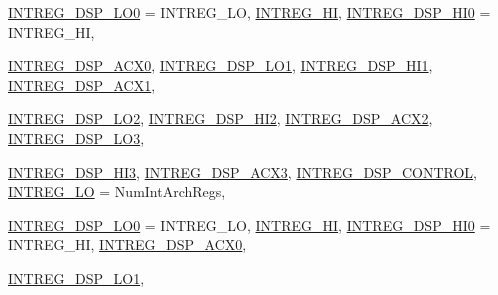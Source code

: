 \begin{DoxyCompactItemize}
\hyperlink{namespaceMipsISA_a9969c99e14b7b491ae9e3751404cc6a1a9a6440c5ae153540100888246bae0b41}{INTREG\_\-DSP\_\-LO0} =  INTREG\_\-LO, 
\hyperlink{namespaceMipsISA_a9969c99e14b7b491ae9e3751404cc6a1ab81dfa3bdd01e788f09f7a15a6efa175}{INTREG\_\-HI}, 
\hyperlink{namespaceMipsISA_a9969c99e14b7b491ae9e3751404cc6a1ac1c3dde172a813c59f953650384a4375}{INTREG\_\-DSP\_\-HI0} =  INTREG\_\-HI, 
\par
\hyperlink{namespaceMipsISA_a9969c99e14b7b491ae9e3751404cc6a1ad3637de2e59bf51c4004e2aef9dc89e0}{INTREG\_\-DSP\_\-ACX0}, 
\hyperlink{namespaceMipsISA_a9969c99e14b7b491ae9e3751404cc6a1a8e010a7055cd1e8e55776308966a684c}{INTREG\_\-DSP\_\-LO1}, 
\hyperlink{namespaceMipsISA_a9969c99e14b7b491ae9e3751404cc6a1a6bab93bce1ed54db562fec1e6351ea96}{INTREG\_\-DSP\_\-HI1}, 
\hyperlink{namespaceMipsISA_a9969c99e14b7b491ae9e3751404cc6a1ab9bb424cac3a98ce515249220959d2da}{INTREG\_\-DSP\_\-ACX1}, 
\par
\hyperlink{namespaceMipsISA_a9969c99e14b7b491ae9e3751404cc6a1ae6a77a5985df474645968e72d6750d7a}{INTREG\_\-DSP\_\-LO2}, 
\hyperlink{namespaceMipsISA_a9969c99e14b7b491ae9e3751404cc6a1a1ac558fc178c5b5f2fdf6cb1967ca22a}{INTREG\_\-DSP\_\-HI2}, 
\hyperlink{namespaceMipsISA_a9969c99e14b7b491ae9e3751404cc6a1a551bc11390e740e4bc59ddfb8db9cc20}{INTREG\_\-DSP\_\-ACX2}, 
\hyperlink{namespaceMipsISA_a9969c99e14b7b491ae9e3751404cc6a1af9876f9350daf1e1d95574d9fbde7362}{INTREG\_\-DSP\_\-LO3}, 
\par
\hyperlink{namespaceMipsISA_a9969c99e14b7b491ae9e3751404cc6a1a985097d69553dc760c911447989f8e60}{INTREG\_\-DSP\_\-HI3}, 
\hyperlink{namespaceMipsISA_a9969c99e14b7b491ae9e3751404cc6a1a7b37f81d5304a3d791c17361d9f3a454}{INTREG\_\-DSP\_\-ACX3}, 
\hyperlink{namespaceMipsISA_a9969c99e14b7b491ae9e3751404cc6a1a6e80b2e1811d722f397003fc3aa77298}{INTREG\_\-DSP\_\-CONTROL}, 
\hyperlink{namespaceMipsISA_a9969c99e14b7b491ae9e3751404cc6a1a16fac3c219b82e1e7a2a6787ca2e8b85}{INTREG\_\-LO} =  NumIntArchRegs, 
\par
\hyperlink{namespaceMipsISA_a9969c99e14b7b491ae9e3751404cc6a1a9a6440c5ae153540100888246bae0b41}{INTREG\_\-DSP\_\-LO0} =  INTREG\_\-LO, 
\hyperlink{namespaceMipsISA_a9969c99e14b7b491ae9e3751404cc6a1ab81dfa3bdd01e788f09f7a15a6efa175}{INTREG\_\-HI}, 
\hyperlink{namespaceMipsISA_a9969c99e14b7b491ae9e3751404cc6a1ac1c3dde172a813c59f953650384a4375}{INTREG\_\-DSP\_\-HI0} =  INTREG\_\-HI, 
\hyperlink{namespaceMipsISA_a9969c99e14b7b491ae9e3751404cc6a1ad3637de2e59bf51c4004e2aef9dc89e0}{INTREG\_\-DSP\_\-ACX0}, 
\par
\hyperlink{namespaceMipsISA_a9969c99e14b7b491ae9e3751404cc6a1a8e010a7055cd1e8e55776308966a684c}{INTREG\_\-DSP\_\-LO1}, 

\end{DoxyCompactItemize}
